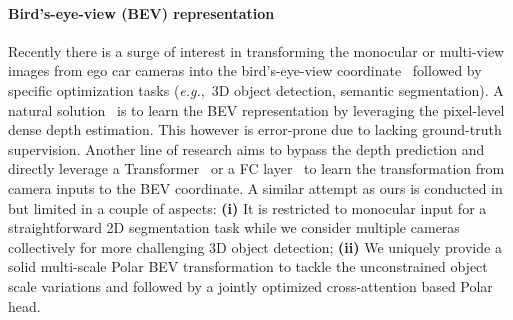 \documentclass[letterpaper]{article} \usepackage{aaai23}  \usepackage{times}  \usepackage{helvet}  \usepackage{courier}  \usepackage[hyphens]{url}  \usepackage{graphicx} \urlstyle{rm} \def\UrlFont{\rm}  \usepackage{natbib}  \usepackage{caption} \frenchspacing  \setlength{\pdfpagewidth}{8.5in} \setlength{\pdfpageheight}{11in} \usepackage{algorithm}
\def\eg{\textit{e.g.}}
\begin{document}
\paragraph{Bird's-eye-view (BEV) representation}
Recently there is a surge of interest in transforming the monocular or multi-view images from ego car cameras into the bird's-eye-view coordinate~\cite{roddick2018orthographic,philion2020lift,li2021hdmapnet,roddick2020predicting,reading2021categorical,saha2021translating} followed by specific optimization tasks (\eg,~3D object detection, semantic segmentation).
A natural solution~\cite{philion2020lift,hu2021fiery} is to 
learn the BEV representation by leveraging the pixel-level dense depth estimation. This however is error-prone due to lacking ground-truth supervision.
Another line of research aims to bypass the depth prediction and directly leverage a Transformer~\cite{chitta2021neat,can2021structured,saha2021translating} or a FC layer~\cite{li2021hdmapnet,roddick2020predicting,yang2021projecting} to learn the transformation from camera inputs to the BEV coordinate.
A similar attempt as ours is conducted in \cite{saha2021translating} but limited in a couple of aspects:
{\bf (i)}
It is restricted to monocular input for a straightforward 2D segmentation task while we consider multiple cameras collectively for more challenging 3D object detection;
{\bf (ii)}
We uniquely provide a solid multi-scale Polar BEV transformation to tackle the unconstrained object scale variations and followed by a jointly optimized cross-attention based Polar head.
\end{document}
